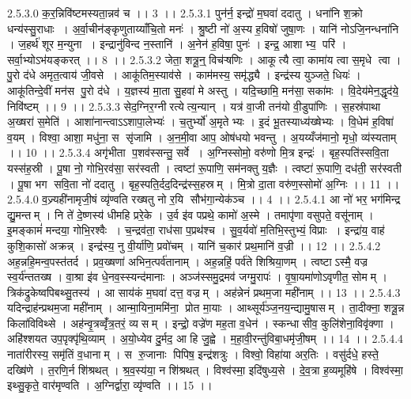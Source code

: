 2.5.3.0
क॒र॒न्निवि॑ष्टमस्यता॒न्नव॑ च ।। 3 ।।
2.5.3.1
पुन॑र्न॒ इन्द्रो॑ म॒घवा॑ ददातु । धना॑नि श॒क्रो धन्य॑स्सु॒राधाः । अ॒र्वा॒चीन॑ङ्कृणुताय्याँचि॒तो मनः॑ । श्रु॒ष्टी नो॑ अ॒स्य ह॒विषो॑ जुषा॒णः । यानि॑ नोऽजि॒नन्धना॑नि । ज॒हर्थ॑ शूर म॒न्युना । इन्द्रानु॑विन्द न॒स्तानि॑ । अ॒नेन॑ ह॒विषा॒ पुनः॑ । इन्द्र॒ आशाभ्य॒ परि॑ । सर्वा॒भ्योऽभ॑यङ्करत् ।। 8 ।।
2.5.3.2
जेता॒ शत्रू॒न्॒ विच॑ऱ्षणिः । आकूत्यै त्वा॒ कामा॑य त्वा स॒मृधे त्वा । पु॒रो द॑धे अमृत॒त्वाय॑ जी॒वसे । आकू॑तिम॒स्याव॑से । काम॑मस्य॒ समृ॑द्ध्यै । इन्द्र॑स्य युञ्जते॒ धियः॑ । आकू॑तिन्दे॒वीं मन॑स पु॒रो द॑धे । य॒ज्ञस्य॑ मा॒ता सु॒हवा॑ मे अस्तु । यदि॒च्छामि॒ मन॑सा॒ सका॑मः । वि॒देय॑मेन॒द्धृद॑ये॒ निवि॑ष्टम् ।। 9 ।।
2.5.3.3
सेद॒ग्निर॒ग्नीरत्येत्य॒न्यान् । यत्र॑ वा॒जी तन॑यो वी॒डुपा॑णिः । स॒हस्र॑पाथा अ॒ख्षरा॑ स॒मेति॑ । आशा॑नान्त्वाऽऽशापा॒लेभ्यः॑ । च॒तुर्भ्यो॑ अ॒मृतेभ्यः । इ॒दं भू॒तस्याध्य॑ख्षेभ्यः । वि॒धेम॑ ह॒विषा॑ व॒यम् । विश्वा॒ आशा॒ मधु॑ना॒ स सृ॑जामि । अ॒न॒मी॒वा आप॒ ओष॑धयो भवन्तु । अ॒यय्यँज॑मानो॒ मृधो॒ व्य॑स्यताम् ।। 10 ।।
2.5.3.4
अगृ॑भीता प॒शव॑स्सन्तु॒ सर्वे । अ॒ग्निस्सोमो॒ वरु॑णो मि॒त्र इन्द्रः॑ । बृह॒स्पति॑स्सवि॒ता यस्स॑ह॒स्री । पू॒षा नो॒ गोभि॒रव॑सा॒ सर॑स्वती । त्वष्टा॑ रू॒पाणि॒ सम॑नक्तु य॒ज्ञैः । त्वष्टा॑ रू॒पाणि॒ दध॑ती॒ सर॑स्वती । पू॒षा भग॑ सवि॒ता नो॑ ददातु । बृह॒स्पति॒र्दद॒दिन्द्र॑स्स॒हस्रम् । मि॒त्रो दा॒ता वरु॑ण॒स्सोमो॑ अ॒ग्निः ।। 11 ।।
2.5.4.0
व॒ज्र्यही॑नामृजी॒षं व्यृ॑ण्वति रख्षतु नो र॒यि सौभ॑गा॒न्येक॑ञ्च ।। 4 ।।
2.5.4.1
आ नो॑ भर॒ भग॑मिन्द्र द्यु॒मन्तम् । नि ते॑ दे॒ष्णस्य॑ धीमहि प्ररे॒के । उ॒र्व इ॑व पप्रथे॒ कामो॑ अ॒स्मे । तमापृ॑णा वसुपते॒ वसू॑नाम् । इ॒मङ्कामं॑ मन्दया॒ गोभि॒रश्वैः । च॒न्द्रव॑ता॒ राध॑सा प॒प्रथ॑श्च । सु॒व॒र्यवो॑ म॒तिभि॒स्तुभ्यं॒ विप्राः । इन्द्रा॑य॒ वाह॑ कुशि॒कासो॑ अक्रन्न् । इन्द्र॑स्य॒ नु वी॒र्या॑णि॒ प्रवो॑चम् । यानि॑ च॒कार॑ प्रथ॒मानि॑ व॒ज्री ।। 12 ।।
2.5.4.2
अह॒न्नहि॒मन्व॒पस्त॑तर्द । प्रव॒ख्षणा॑ अभिन॒त्पर्व॑तानाम् । अह॒न्नहिं॒ पर्व॑ते शिश्रिया॒णम् । त्वष्टाऽस्मै॒ वज्र॑ स्व॒र्य॑न्ततख्ष । वा॒श्रा इ॑व धे॒नव॒स्स्यन्द॑मानाः । अञ्ज॑स्समु॒द्रमव॑ जग्मु॒रापः॑ । वृ॒षा॒यमा॑णोऽवृणीत॒ सोमम् । त्रिक॑द्रुकेष्वपिबथ्सु॒तस्य॑ । आ साय॑कं म॒घवा॑ दत्त॒ वज्रम् । अह॑न्नेनं प्रथम॒जा मही॑नाम् ।। 13 ।।
2.5.4.3
यदिन्द्राह॑न्प्रथम॒जा मही॑नाम् । आन्मा॒यिना॒ममि॑ना॒ प्रोत मा॒याः । आथ्सूर्य॑ञ्ज॒नय॒न्द्यामु॒षासम् । ता॒दीक्ना॒ शत्रू॒न्न किला॑विविथ्से । अह॑न्वृ॒त्रव्वृँ॑त्र॒तरं॒ व्यसम् । इन्द्रो॒ वज्रे॑ण मह॒ता व॒धेन॑ । स्कन्धा॑सीव॒ कुलि॑शेना॒विवृ॑क्णा । अहि॑श्शयत उप॒पृक्पृ॑थि॒व्याम् । अ॒यो॒ध्येव दु॒र्मद॒ आ हि जु॒ह्वे । म॒हा॒वी॒रन्तु॑विबा॒धमृ॑जी॒षम् ।। 14 ।।
2.5.4.4
नाता॑रीरस्य॒ समृ॑तिं व॒धानाम् । स रु॒जानाः पिपिष॒ इन्द्र॑शत्रुः । विश्वो॒ विहा॑या अर॒तिः । वसु॑र्दधे॒ हस्ते॒ दख्षि॑णे । त॒रणि॒र्न शि॑श्रथत् । श्र॒व॒स्य॑या॒ न शि॑श्रथत् । विश्व॑स्मा॒ इदि॑षुध्य॒से । दे॒व॒त्रा ह॒व्यमूहि॑षे । विश्व॑स्मा॒ इथ्सु॒कृते॒ वार॑मृण्वति । अ॒ग्निर्द्वारा॒ व्यृ॑ण्वति ।। 15 ।।
